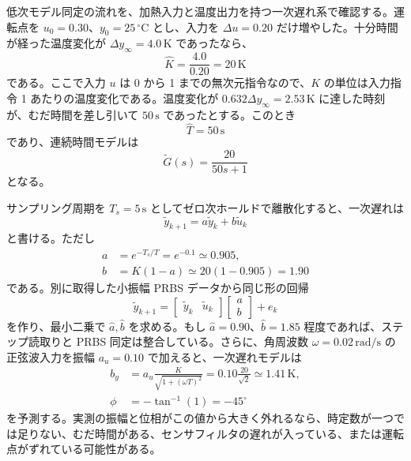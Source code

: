 低次モデル同定の流れを、加熱入力と温度出力を持つ一次遅れ系で確認する。運転点を $u_0=0.30$、$y_0=25\,^\circ\mathrm{C}$ とし、入力を $\Delta u=0.20$ だけ増やした。十分時間が経った温度変化が $\Delta y_\infty=4.0\,\mathrm{K}$ であったなら、
\begin{equation}
  \hat{K}=\frac{4.0}{0.20}=20\,\mathrm{K}
\end{equation}
である。ここで入力 $u$ は 0 から 1 までの無次元指令なので、$K$ の単位は入力指令 1 あたりの温度変化である。温度変化が $0.632\Delta y_\infty=2.53\,\mathrm{K}$ に達した時刻が、むだ時間を差し引いて $50\,\mathrm{s}$ であったとする。このとき
\begin{equation}
  \hat{T}=50\,\mathrm{s}
\end{equation}
であり、連続時間モデルは
\begin{equation}
  \tilde{G}(s)=\frac{20}{50s+1}
\end{equation}
となる。

サンプリング周期を $T_s=5\,\mathrm{s}$ としてゼロ次ホールドで離散化すると、一次遅れは
\begin{equation}
  \tilde{y}_{k+1}=a\tilde{y}_k+b\tilde{u}_k
\end{equation}
と書ける。ただし
\begin{align}
  a&=e^{-T_s/T}=e^{-0.1}\simeq0.905,\\
  b&=K(1-a)\simeq20(1-0.905)=1.90
\end{align}
である。別に取得した小振幅 PRBS データから同じ形の回帰
\begin{equation}
  \tilde{y}_{k+1}=
  \begin{bmatrix}
    \tilde{y}_k&\tilde{u}_k
  \end{bmatrix}
  \begin{bmatrix}
    a\\b
  \end{bmatrix}
  +e_k
\end{equation}
を作り、最小二乗で $\hat{a},\hat{b}$ を求める。もし $\hat{a}=0.90$、$\hat{b}=1.85$ 程度であれば、ステップ読取りと PRBS 同定は整合している。さらに、角周波数 $\omega=0.02\,\mathrm{rad/s}$ の正弦波入力を振幅 $a_u=0.10$ で加えると、一次遅れモデルは
\begin{align}
  b_y
  &=a_u\frac{K}{\sqrt{1+(\omega T)^2}}
    =0.10\frac{20}{\sqrt{2}}
    \simeq1.41\,\mathrm{K},\\
  \phi&=-\tan^{-1}(1)=-45^\circ
\end{align}
を予測する。実測の振幅と位相がこの値から大きく外れるなら、時定数が一つでは足りない、むだ時間がある、センサフィルタの遅れが入っている、または運転点がずれている可能性がある。

